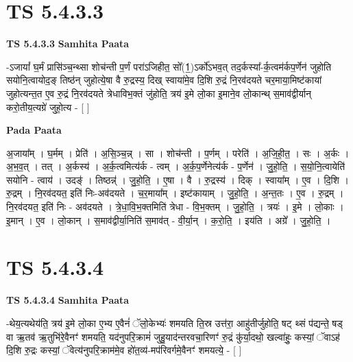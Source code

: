 \documentclass[17pt]{extarticle}
\begin{document}
\section*{ TS 5.4.3.3 }

\textbf{TS 5.4.3.3 } \newline
\textbf{Samhita Paata} \newline

-ऽजायां᳚ घ॒र्मं प्रासि॑ञ्च॒न्थ्सा शोच॑न्ती प॒र्णं परा॑ऽजिहीत॒ सो᳚(1॒)ऽर्को॑ऽभव॒त् तद॒र्कस्या᳚-र्क॒त्वम॑र्कप॒र्णेन॑ जुहोति सयोनि॒त्वायोद॒ङ् तिष्ठ॑न् जुहोत्ये॒षा वै रु॒द्रस्य॒ दिख् स्वाया॑मे॒व दि॒शि रु॒द्रं नि॒रव॑दयते चर॒माया॒मिष्ट॑कायां जुहोत्यन्त॒त ए॒व रु॒द्रं नि॒रव॑दयते त्रेधाविभ॒क्तं जु॑होति॒ त्रय॑ इ॒मे लो॒का इ॒माने॒व लो॒कान्थ् स॒माव॑द्वीर्यान् करो॒तीय॒त्यग्रे॑ जुहो॒त्य - [  ] \newline

\textbf{Pada Paata} \newline

अ॒जाया᳚म् । घ॒र्मम् । प्रेति॑ । अ॒सि॒ञ्च॒न्न् । सा । शोच॑न्ती । प॒र्णम् । परेति॑ । अ॒जि॒ही॒त॒ । सः । अ॒र्कः । अ॒भ॒व॒त् । तत् । अ॒र्कस्य॑ । अ॒र्क॒त्वमित्य॑र्क - त्वम् । अ॒र्क॒प॒र्णेनेत्य॑र्क - प॒र्णेन॑ । जु॒हो॒ति॒ । स॒यो॒नि॒त्वायेति॑ सयोनि - त्वाय॑ । उदङ्॑ । तिष्ठन्न्॑ । जु॒हो॒ति॒ । ए॒षा । वै । रु॒द्रस्य॑ । दिक् । स्वाया᳚म् । ए॒व । दि॒शि । रु॒द्रम् । नि॒रव॑दयत॒ इति॑ निः-अव॑दयते । च॒र॒माया᳚म् । इष्ट॑कायाम् । जु॒हो॒ति॒ । अ॒न्त॒तः । ए॒व । रु॒द्रम् । नि॒रव॑दयत॒ इति॑ निः - अव॑दयते । त्रे॒धा॒वि॒भ॒क्तमिति॑ त्रेधा - वि॒भ॒क्तम् । जु॒हो॒ति॒ । त्रयः॑ । इ॒मे । लो॒काः । इ॒मान् । ए॒व । लो॒कान् । स॒माव॑द्वीर्या॒निति॑ स॒माव॑त् - वी॒र्या॒न् । क॒रो॒ति॒ । इय॑ति । अग्रे᳚ । जु॒हो॒ति॒ ।  \newline




\section*{ TS 5.4.3.4 }

\textbf{TS 5.4.3.4 } \newline
\textbf{Samhita Paata} \newline

-थेय॒त्यथेय॑ति॒ त्रय॑ इ॒मे लो॒का ए॒भ्य ए॒वैनं॑ ॅलो॒केभ्यः॑ शमयति ति॒स्र उत्त॑रा॒ आहु॑तीर्जुहोति॒ षट् थ्सं प॑द्यन्ते॒ षड् वा ऋ॒तव॑ ऋ॒तुभि॑रे॒वैनꣳ॑ शमयति॒ यद॑नुपरि॒क्रामं॑ जुहु॒याद॑न्तरवचा॒रिणꣳ॑ रु॒द्रं कु॑र्या॒दथो॒ खल्वा॑हुः॒ कस्यां॒ ॅवाऽह॑ दि॒शि रु॒द्रः कस्यां॒ ॅवेत्य॑नुपरि॒क्राम॑मे॒व हो॑त॒व्य॑-मप॑रिवर्गमे॒वैनꣳ॑ शमयत्ये॒ - [  ] \newline
\end{document}
